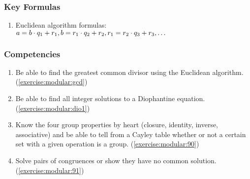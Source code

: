 \subsubsection*{Key Formulas}
\begin{enumerate}
\item
Euclidean algorithm formulas: $a = b \cdot q_{1} + r_{1}, b = r_{1} \cdot q_{2} + r_{2}, \\ r_{1} = r_{2} \cdot q_{3} + r_{3}, \dots$
\end{enumerate}

\subsubsection*{Competencies}
\begin{enumerate}
\item
Be able to find the greatest common divisor using the Euclidean algorithm. (\ref{exercise:modular:gcd})
\item
Be able to find all integer solutions to a Diophantine equation. (\ref{exercise:modular:dio1})
\item
Know the four group properties by heart (closure, identity, inverse, associative) and be able to tell from a Cayley table whether or not a certain set with a given operation is a group.  (\ref{exercise:modular:90})
\item
Solve pairs of congruences or show they have no common solution.(\ref{exercise:modular:91})
\end{enumerate}
